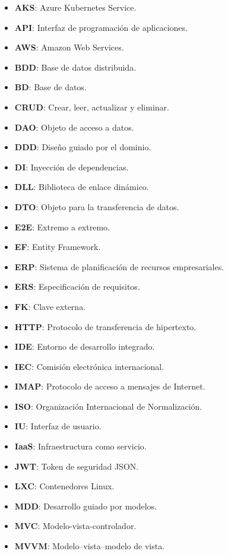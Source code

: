 \documentclass[11pt,spanish,listoffigures]{tfgetsinf}
\begin{document}
\begin{itemize}

\item \textbf{AKS}: Azure Kubernetes Service.
\item \textbf{API}: Interfaz de programación de aplicaciones.
\item \textbf{AWS}: Amazon Web Services.
\item \textbf{BDD}: Base de datos distribuida.
\item \textbf{BD}: Base de datos.
\item \textbf{CRUD}: Crear, leer, actualizar y eliminar.
\item \textbf{DAO}: Objeto de acceso a datos.
\item \textbf{DDD}: Diseño guiado por el dominio.
\item \textbf{DI}: Inyección de dependencias.
\item \textbf{DLL}: Biblioteca de enlace dinámico.
\item \textbf{DTO}: Objeto para la transferencia de datos.
\item \textbf{E2E}: Extremo a extremo.
\item \textbf{EF}: Entity Framework.
\item \textbf{ERP}: Sistema de planificación de recursos empresariales.
\item \textbf{ERS}: Especificación de requisitos.
\item \textbf{FK}: Clave externa.
\item \textbf{HTTP}: Protocolo de transferencia de hipertexto.
\item \textbf{IDE}: Entorno de desarrollo integrado.
\item \textbf{IEC}: Comisión electrónica internacional.
\item \textbf{IMAP}: Protocolo de acceso a mensajes de Internet.
\item \textbf{ISO}: Organización Internacional de Normalización.
\item \textbf{IU}: Interfaz de usuario.
\item \textbf{IaaS}: Infraestructura como servicio.
\item \textbf{JWT}: Token de seguridad JSON.
\item \textbf{LXC}: Contenedores Linux.
\item \textbf{MDD}: Desarrollo guiado por modelos.
\item \textbf{MVC}: Modelo-vista-controlador.
\item \textbf{MVVM}: Modelo–vista–modelo de vista.

\end{itemize}
\end{document}

